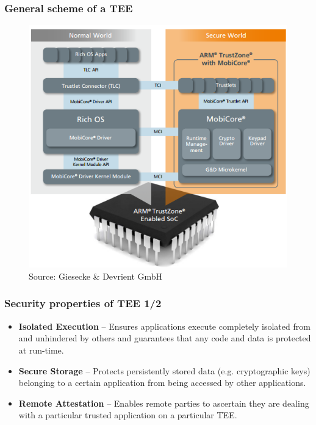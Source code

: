 \documentclass{beamer}
\begin{document}
\begin{frame}
    \frametitle{General scheme of a TEE}

    \begin{figure}[htb]
        \centering
        \includegraphics[scale=.5]{assets/tee}
        \caption{Source: Giesecke \& Devrient GmbH}
    \end{figure}
\end{frame}

\begin{frame}
    \frametitle{Security properties of TEE 1/2}

    \begin{itemize}
        \item {\bf Isolated Execution} -- Ensures applications execute completely isolated from and unhindered by others and guarantees that any code and data is protected at run-time.
        \vfill
        \item {\bf Secure Storage} -- Protects persistently stored data (e.g. cryptographic keys) belonging to a certain application from being accessed by other applications.
        \vfill
        \item {\bf Remote Attestation} -- Enables remote parties to ascertain they are dealing with a particular trusted application on a particular TEE.
    \end{itemize}
\end{frame}
\end{document}

